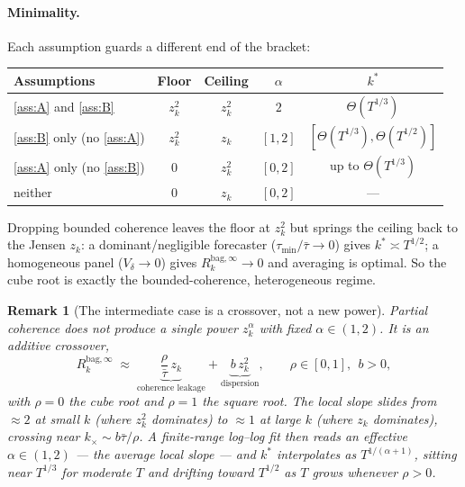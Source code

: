 \documentclass[11pt]{article}
\newcommand{\Rk}{R_k^{\mathrm{bag},\infty}}
\newtheorem{remark}{Remark}
\begin{document}
\paragraph{Minimality.} Each assumption guards a different end of the bracket:
\begin{center}
\begin{tabular}{lcccc}
\hline
Assumptions & Floor & Ceiling & $\alpha$ & $k^\ast$ \\
\hline
\ref{ass:A} and \ref{ass:B} & $z_k^2$ & $z_k^2$ & $2$ & $\Theta(T^{1/3})$ \\
\ref{ass:B} only (no \ref{ass:A}) & $z_k^2$ & $z_k$ & $[1,2]$ & $[\Theta(T^{1/3}),\Theta(T^{1/2})]$ \\
\ref{ass:A} only (no \ref{ass:B}) & $0$ & $z_k^2$ & $[0,2]$ & up to $\Theta(T^{1/3})$ \\
neither & $0$ & $z_k$ & $[0,2]$ & --- \\
\hline
\end{tabular}
\end{center}
Dropping bounded coherence leaves the floor at $z_k^2$ but springs the ceiling back to the
Jensen $z_k$: a dominant/negligible forecaster ($\tau_{\min}/\bar\tau\to0$) gives
$k^\ast\asymp T^{1/2}$; a homogeneous panel ($V_\delta\to0$) gives $\Rk\to0$ and averaging
is optimal. So the cube root is exactly the bounded-coherence, heterogeneous regime.

\begin{remark}[The intermediate case is a crossover, not a new power]\label{rem:cross}
Partial coherence does \emph{not} produce a single power $z_k^\alpha$ with fixed
$\alpha\in(1,2)$. It is an additive crossover,
\[
  \Rk\;\approx\;\underbrace{\frac{\rho}{\bar\tau}\,z_k}_{\text{coherence leakage}}
  +\underbrace{b\,z_k^2}_{\text{dispersion}},\qquad\rho\in[0,1],\ \ b>0,
\]
with $\rho=0$ the cube root and $\rho=1$ the square root. The \emph{local} slope slides
from $\approx2$ at small $k$ (where $z_k^2$ dominates) to $\approx1$ at large $k$ (where
$z_k$ dominates), crossing near $k_\times\sim b\bar\tau/\rho$. A finite-range log--log fit
then reads an effective $\alpha\in(1,2)$ --- the average local slope --- and $k^\ast$
interpolates as $T^{1/(\alpha+1)}$, sitting near $T^{1/3}$ for moderate $T$ and drifting
toward $T^{1/2}$ as $T$ grows whenever $\rho>0$.
\end{remark}
\end{document}
